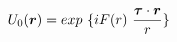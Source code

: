 \begin{equation}
U_0(\mbox{\boldmath$r$})=exp~\{ iF(r) ~\frac{\mbox{\boldmath$\tau$} \cdot \mbox{\boldmath$r$}}{r} \}
\end{equation}

